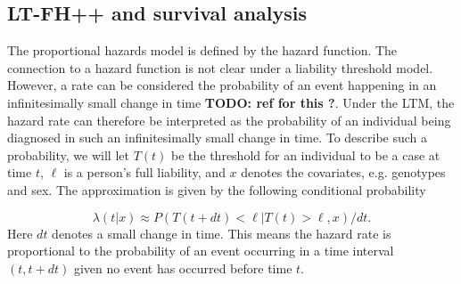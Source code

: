 %

\subsection{LT-FH++ and survival analysis}
The proportional hazards model is defined by the hazard function. The connection to a hazard function is not clear under a liability 
threshold model. However, a rate can be considered the probability of an event happening in an infinitesimally small change in time 
\textbf{TODO: ref for this ?}. Under the LTM, the hazard rate can therefore be interpreted as the probability of an individual being 
diagnosed in such an infinitesimally small change in time\cite{kragh2021analysis}. To describe such a probability, we will let $ T(t) 
$ be the threshold for an individual to be a case at time $ t $, $ \ell $ is a person's full liability, and $ x $ denotes the 
covariates, e.g. genotypes and sex. The approximation is given by the following conditional probability

\begin{equation}\label{eq:ltm_case_prob_approx}
	\lambda(t|x) \approx 
	P(T(t + dt) < \ell | T(t) > \ell, x) / dt.
\end{equation}
Here $ dt $ denotes a small change in time. This means the hazard rate is proportional to the probability of an event occurring in a time interval $ (t, t + dt) $ given no event has occurred before time $ t $.

